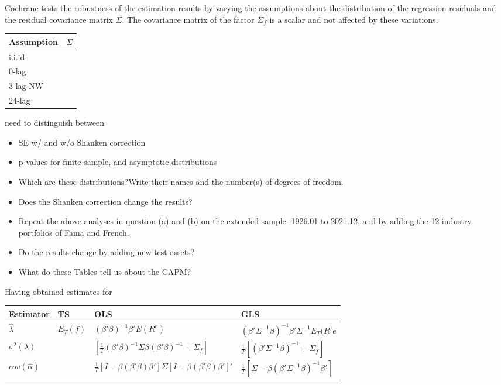 \documentclass[]{article}
\begin{document}
\begin{itemize}
	Cochrane tests the robustness of the estimation results by varying the assumptions about the distribution of the regression residuals and the residual covariance matrix $\Sigma$. The covariance matrix of the factor $\Sigma_f$ is a scalar and not affected by these variations.
	
	\begin{tabular}{|l|l|}
		\hline
		Assumption & $\Sigma$\\
		\hline
		i.i.id &\\
		0-lag &\\
		3-lag-NW&\\
		24-lag&\\
	\end{tabular}
	
	need to distinguish between
	\begin{itemize}
		\item SE w/ and w/o Shanken correction\\
		\item p-values for finite sample, and asymptotic distributions\\
		\item Which  are  these  distributions?Write  their names and the number(s) of degrees of freedom.
		\item Does  the  Shanken  correction  change  the  results?
		\item Repeat the above analyses in question (a) and (b) on the extended sample: 1926.01 to 2021.12, and by adding the 12 industry portfolios of Fama and French.
		\item Do the results change by adding new test assets?
		\item What do these Tables tell us about the CAPM?
		
	\end{itemize}
	
	Having obtained estimates for 
	
	\begin{tabular}{|l|l|l|l|}
		\hline
		Estimator & TS & OLS & GLS \\
		\hline
		$\hat{\lambda}$&$E_T(f)$&$(\beta'\beta)^{-1}\beta'E(R^e)$&$\left(\beta'\Sigma^{-1}\beta\right)^{-1}\beta'\Sigma^{-1}E_T(R^)e$\\
		$\sigma^2(\lambda)$ &  &   $\left[\frac{1}{T}(\beta'\beta)^{-1}\Sigma\beta(\beta'\beta)^{-1}+\Sigma_f\right]$  & $\frac{1}{T}\left[(\beta'\Sigma^{-1}\beta)^{-1}+\Sigma_f\right]$ \\
		$cov(\hat{\alpha})$&&$\frac{1}{T}\left[I-\beta(\beta'\beta)\beta'\right]\Sigma\left[I-\beta(\beta'\beta)\beta'\right]'$&$\frac{1}{T}\left[\Sigma-\beta(\beta'\Sigma^{-1}\beta)^{-1}\beta'\right]$\\
		\hline
	\end{tabular}
	
\end{itemize}
\end{document}
